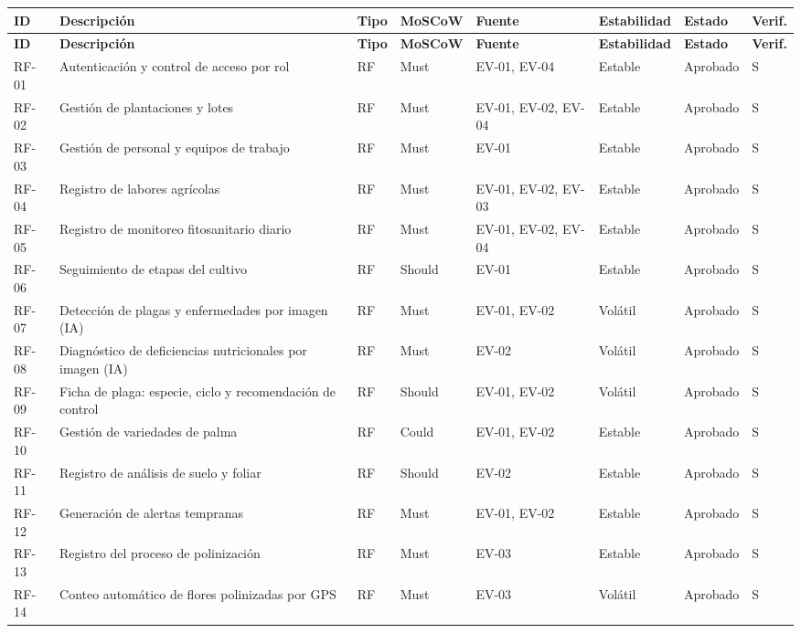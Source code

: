 \documentclass[11pt,a4paper]{report}
\begin{document}
\begin{longtable}{|
p{1.2cm}|
p{4.4cm}|
p{0.8cm}|
p{1.7cm}|
p{1.3cm}|
p{2cm}|
p{1.5cm}|
p{0.8cm}|}
\hline
\textbf{ID} & \textbf{Descripción} & \textbf{Tipo} & \textbf{MoSCoW} & \textbf{Fuente} &
\textbf{Estabilidad} & \textbf{Estado} & \textbf{Verif.} \\
\hline
\endfirsthead
\hline
\textbf{ID} & \textbf{Descripción} & \textbf{Tipo} & \textbf{MoSCoW} & \textbf{Fuente} &
\textbf{Estabilidad} & \textbf{Estado} & \textbf{Verif.} \\
\hline
\endhead
RF-01 & Autenticación y control de acceso por rol & RF & Must & EV-01, EV-04 & Estable & Aprobado & S \\ \hline
RF-02 & Gestión de plantaciones y lotes & RF & Must & EV-01, EV-02, EV-04 & Estable & Aprobado & S \\ \hline
RF-03 & Gestión de personal y equipos de trabajo & RF & Must & EV-01 & Estable & Aprobado & S \\ \hline
RF-04 & Registro de labores agrícolas & RF & Must & EV-01, EV-02, EV-03 & Estable & Aprobado & S \\ \hline
RF-05 & Registro de monitoreo fitosanitario diario & RF & Must & EV-01, EV-02, EV-04 & Estable & Aprobado & S \\ \hline
RF-06 & Seguimiento de etapas del cultivo & RF & Should & EV-01 & Estable & Aprobado & S \\ \hline
RF-07 & Detección de plagas y enfermedades por imagen (IA) & RF & Must & EV-01, EV-02 & Volátil & Aprobado & S \\ \hline
RF-08 & Diagnóstico de deficiencias nutricionales por imagen (IA) & RF & Must & EV-02 & Volátil & Aprobado & S \\ \hline
RF-09 & Ficha de plaga: especie, ciclo y recomendación de control & RF & Should & EV-01, EV-02 & Volátil & Aprobado & S \\ \hline
RF-10 & Gestión de variedades de palma & RF & Could & EV-01, EV-02 & Estable & Aprobado & S \\ \hline
RF-11 & Registro de análisis de suelo y foliar & RF & Should & EV-02 & Estable & Aprobado & S \\ \hline
RF-12 & Generación de alertas tempranas & RF & Must & EV-01, EV-02 & Estable & Aprobado & S \\ \hline
RF-13 & Registro del proceso de polinización & RF & Must & EV-03 & Estable & Aprobado & S \\ \hline
RF-14 & Conteo automático de flores polinizadas por GPS & RF & Must & EV-03 & Volátil & Aprobado & S \\ \hline

\end{longtable}
\end{document}
